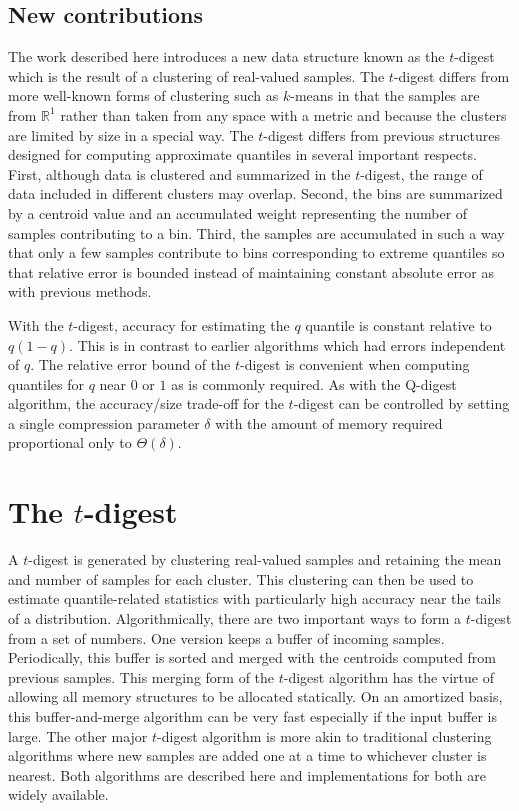 \documentclass[11pt]{amsart}
\begin{document}
\subsection{New contributions}
The work described here introduces a new data structure known as the $t$-digest which is the result of a clustering of real-valued samples. The $t$-digest differs from more well-known forms of clustering such as $k$-means in that the samples are from $\mathbb R^1$ rather than taken from any space with a metric and because the clusters are limited by size in a special way. The $t$-digest differs from previous structures designed for computing approximate quantiles in several important respects. First, although data is clustered and summarized in the $t$-digest, the range of data included in different clusters may overlap. Second, the bins are summarized by a centroid value and an accumulated weight representing the number of samples contributing to a bin. Third, the samples are accumulated in such a way that only a few samples contribute to bins corresponding to extreme quantiles so that relative error is bounded instead of maintaining constant absolute error as with previous methods.

With the $t$-digest, accuracy for estimating the $q$ quantile is constant relative to $q(1-q)$.  This is in contrast to earlier algorithms which had errors independent of $q$.  The relative error bound of the $t$-digest is convenient when computing quantiles for $q$ near $0$ or $1$ as is commonly required.  As with the Q-digest algorithm, the accuracy/size trade-off for the $t$-digest can be controlled by setting a single compression parameter $\delta$ with the amount of memory required proportional only to $\Theta(\delta)$. 
\section{The $t$-digest}
A $t$-digest is generated by clustering real-valued samples and retaining the mean and number of samples for each cluster. This clustering can then be used to estimate quantile-related statistics with particularly high accuracy near the tails of a distribution. Algorithmically, there are two important ways to form a $t$-digest from a set of numbers. One version keeps a buffer of incoming samples. Periodically, this buffer is sorted and merged with the centroids computed from previous samples. This merging form of the $t$-digest algorithm has the virtue of allowing all memory structures to be allocated statically. On an amortized basis, this buffer-and-merge algorithm can be very fast especially if the input buffer is large. The other major $t$-digest algorithm is more akin to traditional clustering algorithms where new samples are added one at a time to whichever cluster is nearest.  Both algorithms are described here and implementations for both are widely available. 
\end{document}
